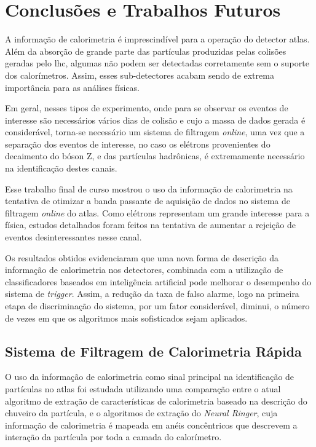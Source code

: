 

\chapter{Conclusões e Trabalhos Futuros}
\label{cap:conclusao}
\glsresetall

A informação de calorimetria é imprescindível para a operação do detector \acrshort{atlas}. Além da absorção
de grande parte das partículas produzidas pelas colisões geradas pelo \acrshort{lhc}, algumas não podem ser
detectadas corretamente sem o suporte dos calorímetros. Assim, esses sub-detectores acabam sendo
de extrema importância para as análises físicas.

Em geral, nesses tipos de experimento, onde para se observar os eventos de interesse são necessários
vários dias de colisão e cujo a massa de dados gerada é considerável, torna-se necessário um 
sistema de filtragem \textit{online}, uma vez que a separação dos eventos de interesse, no caso os elétrons provenientes
do decaimento do bóson Z, e das partículas hadrônicas, é extremamente necessário na identificação
destes canais.

Esse trabalho final de curso mostrou o uso da informação de calorimetria na tentativa de otimizar a banda
passante de aquisição de dados no sistema de filtragem \textit{online} do \acrshort{atlas}. Como elétrons
representam um grande interesse para a física, estudos detalhados foram feitos na tentativa de aumentar
a rejeição de eventos desinteressantes nesse canal.

Os resultados obtidos evidenciaram que uma nova forma de descrição
da informação de calorimetria nos detectores, combinada com a utilização de classificadores baseados em inteligência
artificial pode melhorar o desempenho do sistema de \textit{trigger}. Assim, a redução da taxa de falso 
alarme, logo na primeira etapa de discriminação do sistema, por um fator considerável, diminui, 
o número de vezes em que os algoritmos mais sofisticados sejam aplicados.

\section{Sistema de Filtragem de Calorimetria Rápida}

O uso da informação de calorimetria como sinal principal na identificação de partículas no \acrshort{atlas} foi estudada
utilizando uma comparação entre o atual algoritmo de extração de características de calorimetria baseado
na descrição do chuveiro da partícula, e o algoritmos de extração do \textit{Neural Ringer}, cuja informação de calorimetria
é mapeada em anéis concêntricos que descrevem a interação da partícula por toda a camada do calorímetro.

